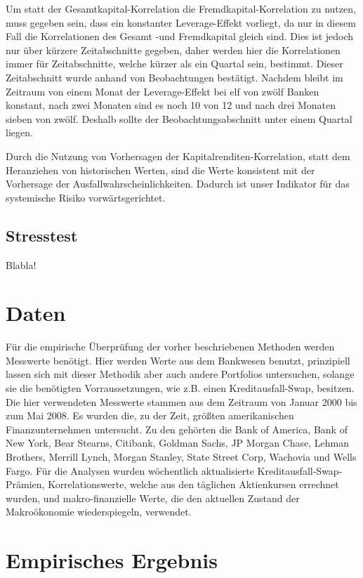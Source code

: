 \documentclass[a4paper,12pt]{scrartcl}
\begin{document}
Um statt der Gesamtkapital-Korrelation die Fremdkapital-Korrelation zu nutzen, muss gegeben sein, dass ein konstanter Leverage-Effekt vorliegt, da nur in diesem Fall die Korrelationen des Gesamt -und Fremdkapital gleich sind. Dies ist jedoch nur über kürzere Zeitabschnitte gegeben, daher werden hier die Korrelationen immer für Zeitabschnitte, welche kürzer als ein Quartal sein, bestimmt. Dieser Zeitabschnitt wurde anhand von Beobachtungen bestätigt. Nachdem bleibt im Zeitraum von einem Monat der Leverage-Effekt bei elf von zwölf Banken konstant, nach zwei Monaten sind es noch 10 von 12 und nach drei Monaten sieben von zwölf. Deshalb sollte der Beobachtungsabschnitt unter einem Quartal liegen.

Durch die Nutzung von Vorhersagen der Kapitalrenditen-Korrelation, statt dem Heranziehen von historischen Werten, sind die Werte konsistent mit der Vorhersage der Ausfallwahrscheinlichkeiten. Dadurch ist unser Indikator für das systemische Risiko vorwärtsgerichtet. 

\newpage
\subsection{Stresstest}

Blabla!
\newpage
\section{Daten}
Für die empirische Überprüfung der vorher beschriebenen Methoden werden Messwerte benötigt. Hier werden Werte aus dem Bankwesen benutzt, prinzipiell lassen sich mit dieser Methodik aber auch andere Portfolios untersuchen, solange sie die benötigten Vorraussetzungen, wie z.B. einen Kreditausfall-Swap, besitzen. 
Die hier verwendeten Messwerte stammen aus dem Zeitraum von Januar 2000 bis zum Mai 2008. Es wurden die, zu der Zeit, größten amerikanischen Finanzunternehmen untersucht. Zu den gehörten die Bank of America, Bank of New York, Bear Stearns, Citibank, Goldman Sachs, JP Morgan Chase, Lehman Brothers, Merrill Lynch, Morgan Stanley, State Street Corp, Wachovia und Wells Fargo. 
Für die Analysen wurden wöchentlich aktualisierte Kreditausfall-Swap-Prämien, Korrelationswerte, welche aus den täglichen Aktienkursen errechnet wurden, und makro-finanzielle Werte, die den aktuellen Zustand der Makroökonomie wiederspiegeln,  verwendet.

\newpage
\section{Empirisches Ergebnis}
\newpage
\end{document}
